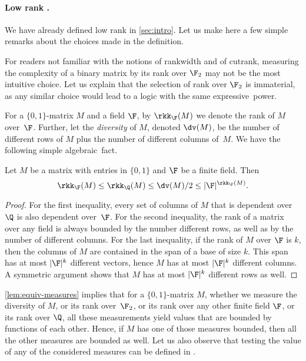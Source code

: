 \paragraph*{Low rank \mso.} We have already defined low rank \mso in \cref{sec:intro}. Let us make here a few simple remarks about the choices made in the definition.

For readers not familiar with the notions of rankwidth and of cutrank, measuring the complexity of a binary matrix by its rank over $\F_2$ may not be the most intuitive choice. Let us explain that the  selection of rank over $\F_2$ is immaterial, as any similar choice would lead to a logic with the same expressive~power.

For a $\{0,1\}$-matrix $M$ and a field $\F$, by $\rkk_\F(M)$ we denote the rank of $M$ over~$\F$. Further, let the {\em{diversity}} of $M$, denoted $\dv(M)$, be the number of different rows of $M$ plus the number of different columns of~$M$. We have the following simple algebraic~fact.

\begin{lemma}\label{lem:equiv-measures}
 Let $M$ be a matrix with entries in $\{0,1\}$ and $\F$ be a finite field. Then
 \[\rkk_\F(M)\leq \rkk_\Q(M)\leq \dv(M)/2\leq |\F|^{\rkk_\F(M)}.\]
\end{lemma}
\begin{proof}
 For the first inequality, every set of columns of $M$ that is dependent over $\Q$ is also dependent over~$\F$. For the second inequality, the rank of a matrix over any field is always bounded by the number different rows, as well as by the number of different columns. For the last inequality, if the rank of $M$ over $\F$ is $k$, then the columns of $M$ are contained in the span of a base of size $k$. This span has at most $|\F|^k$ different vectors, hence $M$ has at most $|\F|^k$ different columns. A symmetric argument shows that $M$ has at most $|\F|^k$ different rows as well.
\end{proof}

\cref{lem:equiv-measures} implies that for a $\{0,1\}$-matrix $M$, whether we measure the diversity of $M$, or its rank over~$\F_2$, or its rank over any other finite field $\F$, or its rank over $\Q$, all these measurements yield values that are bounded by functions of each other. Hence, if $M$ has one of those measures bounded, then all the other measures are bounded as well. Let us also observe that testing the value of any of the considered measures can be defined in \fo.

